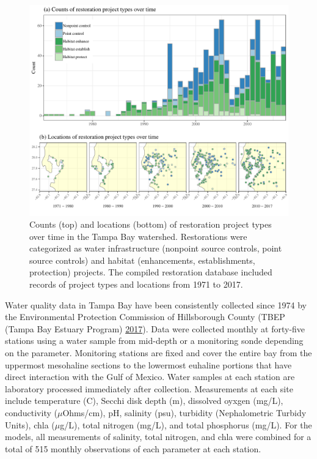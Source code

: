\documentclass[]{article}
\begin{document}
\begin{figure}
\centering
\includegraphics{figs/restyrs-1.pdf}
\caption{Counts (top) and locations (bottom) of restoration project
types over time in the Tampa Bay watershed. Restorations were
categorized as water infrastructure (nonpoint source controls, point
source controls) and habitat (enhancements, establishments, protection)
projects. The compiled restoration database included records of project
types and locations from 1971 to 2017.}
\end{figure}

Water quality data in Tampa Bay have been consistently collected since
1974 by the Environmental Protection Commission of Hillsborough County
(TBEP (Tampa Bay Estuary Program) \protect\hyperlink{ref-TBEP17}{2017}).
Data were collected monthly at forty-five stations using a water sample
from mid-depth or a monitoring sonde depending on the parameter.
Monitoring stations are fixed and cover the entire bay from the
uppermost mesohaline sections to the lowermost euhaline portions that
have direct interaction with the Gulf of Mexico. Water samples at each
station are laboratory processed immediately after collection.
Measurements at each site include temperature (C), Secchi disk depth
(m), dissolved oyxgen (mg/L), conductivity (\(\mu\)Ohms/cm), pH,
salinity (psu), turbidity (Nephalometric Turbidy Units), \ac{chla}
(\(\mu\)g/L), total nitrogen (mg/L), and total phosphorus (mg/L). For
the models, all measurements of salinity, total nitrogen, and \ac{chla}
were combined for a total of 515 monthly observations of each parameter
at each station.
\end{document}
